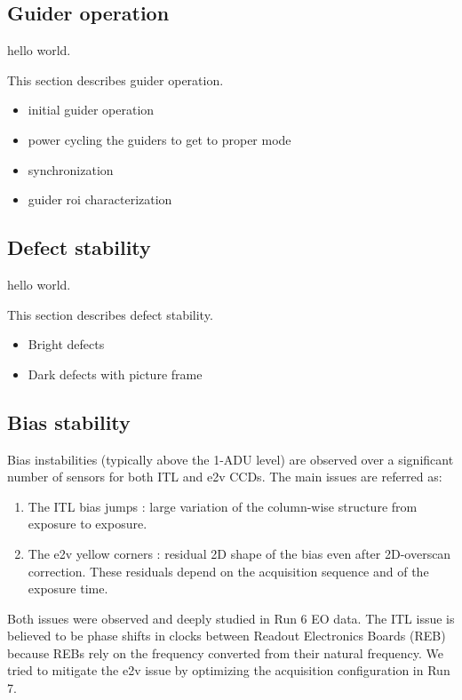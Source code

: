 \subsection{Guider operation}\label{guider-operation}

hello world.

This section describes guider operation.

\begin{itemize}
\tightlist
\item
  initial guider operation
\item
  power cycling the guiders to get to proper mode
\item
  synchronization
\item
  guider roi characterization
\end{itemize}

\subsection{Defect stability}\label{defect-stability}

hello world.

This section describes defect stability.

\begin{itemize}
\tightlist
\item
  Bright defects
\item
  Dark defects with picture frame
\end{itemize}

\subsection{Bias stability}\label{bias-stability-2}

Bias instabilities (typically above the 1-ADU level) are observed over a
significant number of sensors for both ITL and e2v CCDs. The main issues
are referred as:

\begin{enumerate}
\tightlist
\item
  The ITL bias jumps : large variation of the column-wise structure from
  exposure to exposure.
\item
  The e2v yellow corners : residual 2D shape of the bias even after
  2D-overscan correction. These residuals depend on the acquisition
  sequence and of the exposure time.
\end{enumerate}

Both issues were observed and deeply studied in Run 6 EO data. The ITL
issue is believed to be phase shifts in clocks between Readout
Electronics Boards (REB) because REBs rely on the frequency converted
from their natural frequency. We tried to mitigate the e2v issue by
optimizing the acquisition configuration in Run 7.

